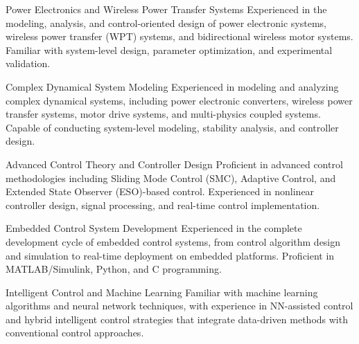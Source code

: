 
\vspace{1em}
\begin{cvexpertises}

  \begin{cvexpertise}{Power Electronics and Wireless Power Transfer Systems}
  Experienced in the modeling, analysis, and control-oriented design of power electronic systems, wireless power transfer (WPT) systems, and bidirectional wireless motor systems. Familiar with system-level design, parameter optimization, and experimental validation.
  \end{cvexpertise}

  \begin{cvexpertise}{Complex Dynamical System Modeling}
  Experienced in modeling and analyzing complex dynamical systems, including power electronic converters, wireless power transfer systems, motor drive systems, and multi-physics coupled systems. Capable of conducting system-level modeling, stability analysis, and controller design.
  \end{cvexpertise}

  \begin{cvexpertise}{Advanced Control Theory and Controller Design}
  Proficient in advanced control methodologies including Sliding Mode Control (SMC), Adaptive Control, and Extended State Observer (ESO)-based control. Experienced in nonlinear controller design, signal processing, and real-time control implementation.
  \end{cvexpertise}

  \begin{cvexpertise}{Embedded Control System Development}
  Experienced in the complete development cycle of embedded control systems, from control algorithm design and simulation to real-time deployment on embedded platforms. Proficient in MATLAB/Simulink, Python, and C programming.
  \end{cvexpertise}

  \begin{cvexpertise}{Intelligent Control and Machine Learning}
  Familiar with machine learning algorithms and neural network techniques, with experience in NN-assisted control and hybrid intelligent control strategies that integrate data-driven methods with conventional control approaches.
  \end{cvexpertise}

\end{cvexpertises}
